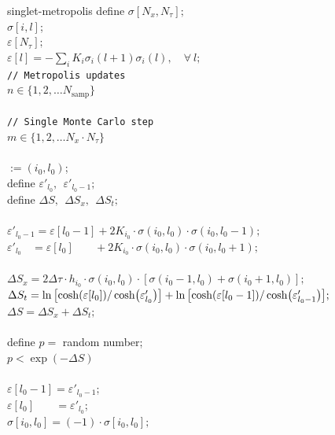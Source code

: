 \documentclass[../journal_main.tex]{subfiles}
\begin{document}
\begin{algorithm}{singlet-metropolis}
    \> define $\sigma[N_x ,N_\tau];$ \\
    \>  $\sigma[i, l]$;\\
    \>  $\varepsilon[N_\tau];$ \\
    \>  $\varepsilon[l] = -\sum_i K_i \sigma_i(l+1) \sigma_i(l), \quad\forall\: l;$ \\
    \> \texttt{// Metropolis updates} \\
     $n \in \{1, 2, \ldots N_\text{samp}\}$ \\
    \\
    \>\> \texttt{// Single Monte Carlo step} \\
    \> $m \in \{1, 2, \ldots N_x \cdot N_\tau \}$ \\
    \>\\
    \>\>\> $:=(i_0, l_0)$;\\
    \>\>\> define $\varepsilon'_{l_0}, \:\:
    \varepsilon'_{l_0 - 1}; $\\
    \>\>\> define $\Delta S, \:\: \Delta S_x, \:\: \Delta S_t;$\\
    \\
    \>\>\> $\varepsilon'_{l_0-1} = \varepsilon[l_0-1] + 2K_{i_0}\cdot\sigma(i_0, l_0)\cdot\sigma(i_0, l_0-1);$\\
    \>\>\> $\varepsilon'_{l_0}\:\:\:\: = \varepsilon[l_0] \:\:\:\:\quad + 2K_{i_0}\cdot\sigma(i_0, l_0)\cdot\sigma(i_0, l_0+1);$\\
    \\
    \>\>\> $\Delta S_x = 2\Delta \tau \cdot h_{i_0} \cdot \sigma(i_0, l_0) \cdot [\sigma(i_0-1,l_0) + \sigma(i_0+1,l_0)];$ \\
    \>\>\> $\Delta S_t = \ln \qty[\cosh(\varepsilon[l_0])/\cosh(\varepsilon'_{l_0})] + \ln\qty[\cosh(\varepsilon[l_0-1])/\cosh(\varepsilon'_{l_0-1})] ;$ \\
    \>\>\> $\Delta S = \Delta S_x + \Delta S_t ;$ \\ 
    \\
    \>\>\> define $p = $ random number; \\
    \>\> $p < \exp(-\Delta S)$\\  
    \>\>\\
    \>\>\>\> $\varepsilon[l_0 - 1] = \varepsilon'_{l_0-1}$; \\
    \>\>\>\> $\varepsilon[l_0] \:\:\:\:\quad =  \varepsilon'_{l_0}$; \\
    \>\>\>\> $\sigma[i_0, l_0] = (-1)\cdot \sigma[i_0, l_0];$\\
    \>\>\\
    \>\\
    \\
\end{algorithm}
\end{document}
